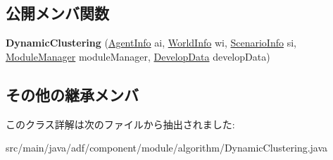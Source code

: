 \subsection*{公開メンバ関数}
\begin{DoxyCompactItemize}
\item 
\hypertarget{classadf_1_1component_1_1module_1_1algorithm_1_1DynamicClustering_ab2d451e53f375755f489e976f3b98f30}{}\label{classadf_1_1component_1_1module_1_1algorithm_1_1DynamicClustering_ab2d451e53f375755f489e976f3b98f30} 
{\bfseries Dynamic\+Clustering} (\hyperlink{classadf_1_1agent_1_1info_1_1AgentInfo}{Agent\+Info} ai, \hyperlink{classadf_1_1agent_1_1info_1_1WorldInfo}{World\+Info} wi, \hyperlink{classadf_1_1agent_1_1info_1_1ScenarioInfo}{Scenario\+Info} si, \hyperlink{classadf_1_1agent_1_1module_1_1ModuleManager}{Module\+Manager} module\+Manager, \hyperlink{classadf_1_1agent_1_1develop_1_1DevelopData}{Develop\+Data} develop\+Data)
\end{DoxyCompactItemize}
\subsection*{その他の継承メンバ}


このクラス詳解は次のファイルから抽出されました\+:\begin{DoxyCompactItemize}
\item 
src/main/java/adf/component/module/algorithm/Dynamic\+Clustering.\+java\end{DoxyCompactItemize}
